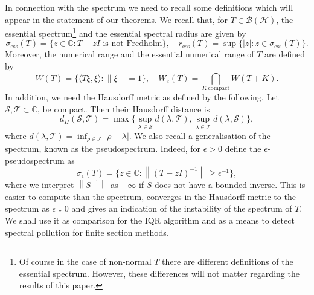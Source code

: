 \documentclass[a4paper,10pt]{article}
\begin{document}
In connection with the spectrum we need to recall some definitions which will appear in the statement of our theorems. We recall that, for $T \in \mathcal{B}(\mathcal{H})$, the essential spectrum\footnote{Of course in the case of non-normal $T$ there are different definitions of the essential spectrum. However, these differences will not matter regarding the results of this paper.} and the essential spectral radius are given by
$$
\sigma_{\mathrm{ess}}(T) = \{z\in\mathbb{C}:T-zI\text{ is not Fredholm}\}, \quad r_{\mathrm{ess}}(T) = \sup \{|z|: z \in \sigma_{\mathrm{ess}}(T)\}.
$$
Moreover, the numerical range and the essential numerical range of $T$ are defined by
\[
W(T) = \{\langle T\xi,\xi\rangle:\|\xi\| = 1\}, \quad W_e(T) = \bigcap_{K \, \text{compact}} \overline{W(T + K)}.
\]
In addition, we need the Hausdorff metric as defined by the following. Let $\mathcal{S}, \mathcal{T} \subset \mathbb{C}$, be compact. Then their
Hausdorff distance is 
\begin{equation}\label{eq:Hausdorff}
d_H(\mathcal{S},\mathcal{T}) = \max \{\sup_{\lambda \in \mathcal{S}}
d(\lambda,\mathcal{T}), \sup_{\lambda \in \mathcal{T}} d(\lambda,\mathcal{S})\},
\end{equation} 
where $d(\lambda,\mathcal{T}) = \inf_{\rho \in\mathcal{T}}|\rho-\lambda|.$ 
 We also recall a generalisation of the spectrum, known as the pseudospectrum.
Indeed, for $\epsilon>0$ define the $\epsilon$-pseudospectrum as
$$
\sigma_{\epsilon}(T)=\{z\in\mathbb{C} :\left\|(T - zI)^{-1}\right\|\geq{\epsilon}^{-1}\},
$$
where we interpret $\left\|S^{-1}\right\|$ as $+\infty$ if $S$ does not have a bounded inverse.
This is easier to compute than the spectrum, converges in the Hausdorff metric to the spectrum as $\epsilon\downarrow0$ and gives an indication of the instability of the spectrum of $T$. We shall use it as comparison for the IQR algorithm and as a means to detect spectral pollution for finite section methods.
\end{document}
